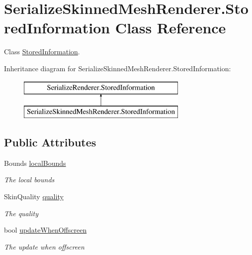 \hypertarget{class_serialize_skinned_mesh_renderer_1_1_stored_information}{}\section{Serialize\+Skinned\+Mesh\+Renderer.\+Stored\+Information Class Reference}
\label{class_serialize_skinned_mesh_renderer_1_1_stored_information}


Class \hyperlink{class_serialize_skinned_mesh_renderer_1_1_stored_information}{Stored\+Information}.  


Inheritance diagram for Serialize\+Skinned\+Mesh\+Renderer.\+Stored\+Information\+:\begin{figure}[H]
\begin{center}
\leavevmode
\includegraphics[height=2.000000cm]{class_serialize_skinned_mesh_renderer_1_1_stored_information}
\end{center}
\end{figure}
\subsection*{Public Attributes}
\begin{DoxyCompactItemize}
\item 
Bounds \hyperlink{class_serialize_skinned_mesh_renderer_1_1_stored_information_ac121d2d52cdf6eefb978699aef61fcc8}{local\+Bounds}
\begin{DoxyCompactList}\small\item\em The local bounds \end{DoxyCompactList}\item 
Skin\+Quality \hyperlink{class_serialize_skinned_mesh_renderer_1_1_stored_information_a57cc5d47dfc78d1cfe959ff8de995edd}{quality}
\begin{DoxyCompactList}\small\item\em The quality \end{DoxyCompactList}\item 
bool \hyperlink{class_serialize_skinned_mesh_renderer_1_1_stored_information_a63c3f6ad98a2c3c962265fdee5ce1858}{update\+When\+Offscreen}
\begin{DoxyCompactList}\small\item\em The update when offscreen \end{DoxyCompactList}\end{DoxyCompactItemize}


